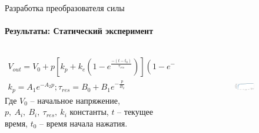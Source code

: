 \documentclass[aspectratio=169,xcolor=table]{beamer}
\begin{document}
\begin{frame}[t]{Разработка преобразователя силы}
    \framesubtitle{Результаты: Статический эксперимент}
    \vspace{-0.5cm}
    \begin{columns}[T,onlytextwidth]
        \begin{column}{0.52\textwidth}
            \begin{eqnarray*}
                V_{out} = V_0 + p[k_p + k_e(1-e^\frac{-(t-t_0)}{\tau_{res}})](1-e^{-\frac{A}{p}}) \\
                k_p = A_1e^{-A_2p}; \tau_{res} = B_0 + B_1e^{-\frac{p}{B_2}}
            \end{eqnarray*}
            Где $V_0$ -- начальное напряжение, $p,\ A_i,\ B_i,\ \tau_{res},\ k_i$ константы, $t$ -- текущее время, $t_0$ -- время начала нажатия.
        \end{column}
        \begin{column}{0.45\textwidth}
            \vspace{-15pt}
            \begin{figure}[H]
                \begin{subfigure}{0.99\textwidth}
                    \centering\includegraphics[height=2.8cm,width=1\textwidth,keepaspectratio]{least_square_model.png}
                    \label{fig:least_square_model.png}
                \end{subfigure}
                \vspace{-1cm}


\end{figure}
\end{column}
\end{columns}
\end{frame}
\end{document}
